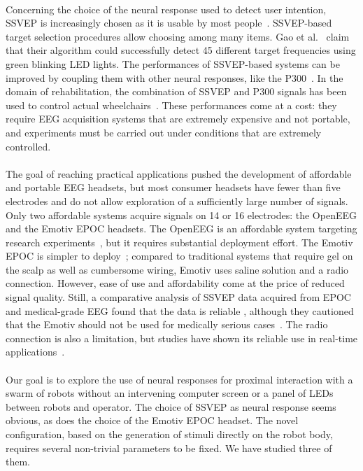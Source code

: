 \documentclass[smallextended]{svjour3}
\begin{document}
\\
Concerning the choice of the neural response used to detect user intention, SSVEP is increasingly chosen as it is usable by most people~\cite{Guger2012}. SSVEP-based target selection procedures allow choosing among many items. 
Gao et al.~\cite{SSVEPfiability} claim that their algorithm could successfully detect 45 different target frequencies using green blinking LED lights. The performances of SSVEP-based systems can be improved by coupling them with other neural responses, like the P300~\cite{yin2015hybrid}. In the domain of rehabilitation, the combination of SSVEP and P300 signals has been used to control actual wheelchairs~\cite{paper4}. These performances come at a cost: they require EEG acquisition systems that are extremely expensive and not portable, and experiments must be carried out under conditions that are extremely controlled.\\
\\
The goal of reaching practical applications pushed the development of affordable and portable EEG headsets, but most consumer headsets have fewer than five electrodes and do not allow exploration of a sufficiently large number of signals. Only two affordable systems acquire signals on 14 or 16 electrodes: the OpenEEG and the Emotiv EPOC headsets. The OpenEEG is an affordable system targeting research experiments~\cite{Salehuddin2011}, but it requires substantial deployment effort. The Emotiv EPOC is simpler to deploy~\cite{jian2014improving,van2012designing}; compared to traditional systems that require gel on the scalp as well as cumbersome wiring, Emotiv uses saline solution and a radio connection. However, ease of use and affordability come at the price of reduced signal quality. Still, a comparative analysis of SSVEP data acquired from EPOC and medical-grade EEG found that the data is reliable \cite{liu2012implementation}, although they cautioned that the Emotiv should not be used for medically serious cases~\cite{duvinage2013performance}. The radio connection is also a limitation, but studies have shown its reliable use in real-time applications~\cite{hvaring2014comparison}.\\
\\
Our goal is to explore the use of neural responses for proximal interaction with a swarm of robots without an intervening computer screen or a panel of LEDs between robots and operator. 
The choice of SSVEP as neural response seems obvious, as does the choice of the Emotiv EPOC headset. 
The novel configuration, based on the generation of stimuli directly on the robot body, requires several non-trivial parameters to be fixed. We have studied three of them.\\
\end{document}
